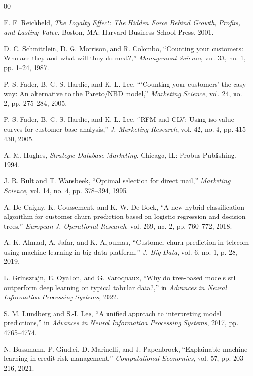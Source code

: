 \documentclass[conference]{IEEEtran}
\begin{document}
\begin{thebibliography}{00}

F. F. Reichheld, \textit{The Loyalty Effect: The Hidden Force Behind Growth, Profits, and Lasting Value}. Boston, MA: Harvard Business School Press, 2001.

D. C. Schmittlein, D. G. Morrison, and R. Colombo, ``Counting your customers: Who are they and what will they do next?,'' \textit{Management Science}, vol. 33, no. 1, pp. 1--24, 1987.

P. S. Fader, B. G. S. Hardie, and K. L. Lee, ```Counting your customers' the easy way: An alternative to the Pareto/NBD model,'' \textit{Marketing Science}, vol. 24, no. 2, pp. 275--284, 2005.

P. S. Fader, B. G. S. Hardie, and K. L. Lee, ``RFM and CLV: Using iso-value curves for customer base analysis,'' \textit{J. Marketing Research}, vol. 42, no. 4, pp. 415--430, 2005.

A. M. Hughes, \textit{Strategic Database Marketing}. Chicago, IL: Probus Publishing, 1994.

J. R. Bult and T. Wansbeek, ``Optimal selection for direct mail,'' \textit{Marketing Science}, vol. 14, no. 4, pp. 378--394, 1995.

A. De Caigny, K. Coussement, and K. W. De Bock, ``A new hybrid classification algorithm for customer churn prediction based on logistic regression and decision trees,'' \textit{European J. Operational Research}, vol. 269, no. 2, pp. 760--772, 2018.

A. K. Ahmad, A. Jafar, and K. Aljoumaa, ``Customer churn prediction in telecom using machine learning in big data platform,'' \textit{J. Big Data}, vol. 6, no. 1, p. 28, 2019.

L. Grinsztajn, E. Oyallon, and G. Varoquaux, ``Why do tree-based models still outperform deep learning on typical tabular data?,'' in \textit{Advances in Neural Information Processing Systems}, 2022.

S. M. Lundberg and S.-I. Lee, ``A unified approach to interpreting model predictions,'' in \textit{Advances in Neural Information Processing Systems}, 2017, pp. 4765--4774.

N. Bussmann, P. Giudici, D. Marinelli, and J. Papenbrock, ``Explainable machine learning in credit risk management,'' \textit{Computational Economics}, vol. 57, pp. 203--216, 2021.


\end{thebibliography}
\end{document}
